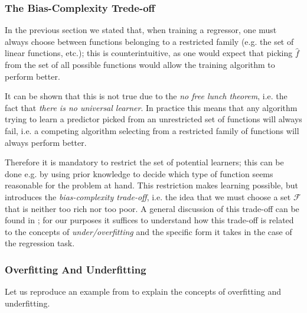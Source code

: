 
\subsubsection{The Bias-Complexity Trede-off}
In the previous section we stated that, when training a regressor, one must always choose between functions belonging to a restricted family (e.g. the set of linear functions, etc.); this is counterintuitive, as one would expect that picking $\hat{f}$ from the set of all possible functions would allow the training algorithm to perform better.

It can be shown that this is not true due to the \emph{no free lunch theorem}, i.e. the fact that \emph{there is no universal learner}. In practice this means that any algorithm trying to learn a predictor picked from an unrestricted set of functions will always fail, i.e. a competing algorithm selecting from a restricted family of functions will always perform better.

Therefore it is mandatory to restrict the set of potential learners; this can be done e.g. by using prior knowledge to decide which type of function seems reasonable for the problem at hand.
This restriction makes learning possible, but introduces the \emph{bias-complexity trade-off}, i.e. the idea that we must choose a set $\mathcal{F}$ that is neither too rich nor too poor. A general discussion of this trade-off can be found in \cite{understanding_ml}; for our purposes it suffices to understand how this trade-off is related to the concepts of \emph{under/overfitting} and the specific form it takes in the case of the regression task.

\subsubsection{Overfitting And Underfitting}
Let us reproduce an example from \cite{understanding_ml} to explain the concepts of overfitting and underfitting.

